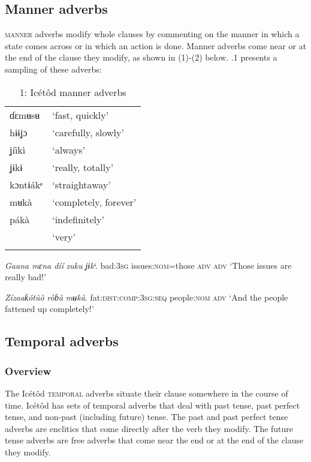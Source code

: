 \begin{table}
\subsection{Manner adverbs}


\textsc{manner }adverbs modify whole clauses by commenting on the manner in which a state comes across or in which an action is done. Manner adverbs come near or at the end of the clause they modify, as shown in (1)-(2) below. .1 presents a sampling of these adverbs:


\begin{table}
\caption{1: Icétôd manner adverbs}
\label{tab:9}


\begin{tabularx}{\textwidth}{XX}
\lsptoprule

ɗɛmʉsʉ & ‘fast, quickly’\\
hɨɨʝɔ & ‘carefully, slowly’\\
ʝíìkì & ‘always’\\
ʝɨkɨ & ‘really, totally’\\
kɔntɨákᵉ & ‘straightaway’\\
mʉkà & ‘completely, forever’\\
pákà & ‘indefinitely’\\ & ‘very’\\
\lspbottomrule
\end{tabularx}
\end{table}



\textit{Gaana   mɛna díí     }\textit{zuku}\textit{   }\textit{ʝɨkᶤ}.
bad:\textsc{3sg}   issues:\textsc{nom}=those   \textsc{adv   adv}
‘Those issues are really bad!’




\textit{Zízaaƙótùò       ròɓà     }\textit{mʉkà}.
fat:\textsc{dist:comp:3sg:seq}   people:\textsc{nom}   \textsc{adv}
‘And the people fattened up completely!’






\subsection{Temporal adverbs}
\subsubsection{Overview}

The Icétôd \textsc{temporal }adverbs situate their clause somewhere in the course of time. Icétôd has sets of temporal adverbs that deal with past tense, past perfect tense, and non-past (including future) tense. The past and past perfect tense adverbs are enclitics that come directly after the verb they modify. The future tense adverbs are free adverbs that come near the end or at the end of the clause they modify. 



\end{table}
